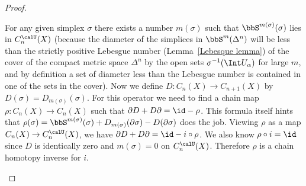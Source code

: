 \begin{proof}
\begin{enumerate}
         For any given simplex $\sigma$ there exists a number $m(\sigma)$ such that $\bbS^{m(\sigma)}(\sigma)$ lies in $C^\calU_n(X)$ (because the diameter of the simplices in $\bbS^m(\Delta^n)$ will be less than the strictly positive Lebesgue number (Lemma~\ref{Lebesque lemma}) of the cover of the compact metric space $\Delta^n$ by the open sets $\sigma^{-1}(\Int U_\alpha)$ for large $m$, and by definition a set of diameter less than the Lebesgue number is contained in one of the sets in the cover). Now we define $D:C_n(X)\to C_{n+1}(X)$ by  $D(\sigma)=D_{m(\sigma)}(\sigma)$. For this operator we need to find a chain map $\rho:C_n(X)\to C_n(X)$ such that $\partial D+D\partial=\id-\rho$. This formula itself hints that $\rho(\sigma)=\bbS^{m(\sigma)}(\sigma)+D_{m(\sigma)}(\partial\sigma)-D(\partial\sigma)$ does the job. Viewing $\rho$ as a map $C_n(X)\to C_n^\calU(X)$, we have $\partial D+D\partial=\id-i\circ\rho$. We also know $\rho\circ i=\id$ since $D$ is identically zero and $m(\sigma)=0$ on $C_n^\calU(X)$. Therefore $\rho$ is a chain homotopy inverse for $i$.
     \end{enumerate}
\end{proof}


